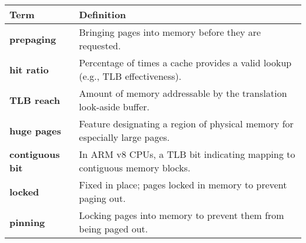 \vspace{1em}
\begin{tabular}{p{}p{}}
\toprule
\rowcolor{lightgray} \textbf{Term} & \textbf{Definition} \\
\midrule
\textbf{prepaging} & Bringing pages into memory before they are requested. \\
\textbf{hit ratio} & Percentage of times a cache provides a valid lookup (e.g., TLB effectiveness). \\
\textbf{TLB reach} & Amount of memory addressable by the translation look-aside buffer. \\
\textbf{huge pages} & Feature designating a region of physical memory for especially large pages. \\
\textbf{contiguous bit} & In ARM v8 CPUs, a TLB bit indicating mapping to contiguous memory blocks. \\
\textbf{locked} & Fixed in place; pages locked in memory to prevent paging out. \\
\textbf{pinning} & Locking pages into memory to prevent them from being paged out. \\
\bottomrule
\end{tabular}
